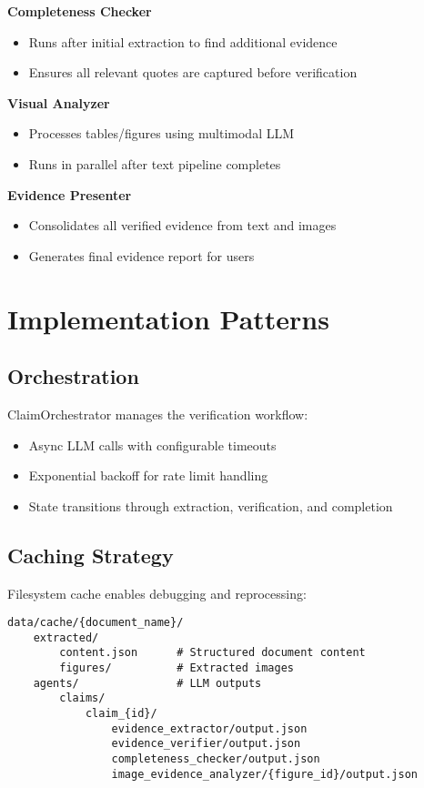 \documentclass[11pt]{article}
\begin{document}
\textbf{Completeness Checker}
\begin{itemize}
\item Runs after initial extraction to find additional evidence
\item Ensures all relevant quotes are captured before verification
\end{itemize}

\textbf{Visual Analyzer}
\begin{itemize}
\item Processes tables/figures using multimodal LLM
\item Runs in parallel after text pipeline completes
\end{itemize}

\textbf{Evidence Presenter}
\begin{itemize}
\item Consolidates all verified evidence from text and images
\item Generates final evidence report for users
\end{itemize}

\section{Implementation Patterns}

\subsection{Orchestration}

ClaimOrchestrator manages the verification workflow:
\begin{itemize}
\item Async LLM calls with configurable timeouts
\item Exponential backoff for rate limit handling
\item State transitions through extraction, verification, and completion
\end{itemize}

\subsection{Caching Strategy}

Filesystem cache enables debugging and reprocessing:

\begin{verbatim}
data/cache/{document_name}/
    extracted/
        content.json      # Structured document content
        figures/          # Extracted images
    agents/               # LLM outputs
        claims/
            claim_{id}/
                evidence_extractor/output.json
                evidence_verifier/output.json
                completeness_checker/output.json
                image_evidence_analyzer/{figure_id}/output.json
\end{verbatim}
\end{document}
